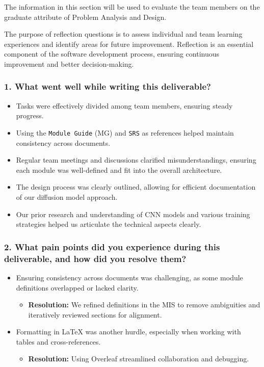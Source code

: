 \documentclass[12pt, titlepage]{article}
\begin{document}
The information in this section will be used to evaluate the team members on the graduate attribute of Problem Analysis and Design. 

The purpose of reflection questions is to assess individual and team learning experiences and identify areas for future improvement. Reflection is an essential component of the software development process, ensuring continuous improvement and better decision-making.

\subsubsection{1. What went well while writing this deliverable?}
\label{sec:wentwell}

\begin{itemize}
    \item Tasks were effectively divided among team members, ensuring steady progress.
    \item Using the \texttt{Module Guide} (MG) and \texttt{SRS} as references helped maintain consistency across documents.
    \item Regular team meetings and discussions clarified misunderstandings, ensuring each module was well-defined and fit into the overall architecture.
    \item The design process was clearly outlined, allowing for efficient documentation of our diffusion model approach.
    \item Our prior research and understanding of CNN models and various training strategies helped us articulate the technical aspects clearly.
\end{itemize}

\subsubsection{2. What pain points did you experience during this deliverable, and how did you resolve them?}
\label{sec:painpoints}

\begin{itemize}
    \item Ensuring consistency across documents was challenging, as some module definitions overlapped or lacked clarity. 
    \begin{itemize}
        \item \textbf{Resolution:} We refined definitions in the MIS to remove ambiguities and iteratively reviewed sections for alignment.
    \end{itemize}
    \item Formatting in LaTeX was another hurdle, especially when working with tables and cross-references.
    \begin{itemize}
        \item \textbf{Resolution:} Using Overleaf streamlined collaboration and debugging.
    \end{itemize}
\end{itemize}
\end{document}
